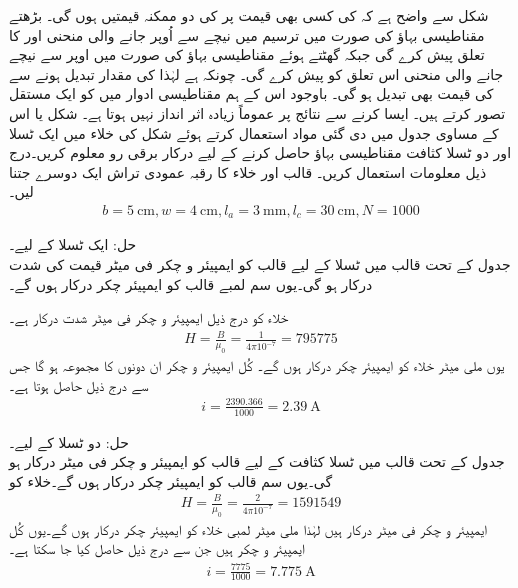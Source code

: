 شکل  سے واضح ہے کہ  کی کسی بھی قیمت پر  کی  دو ممکنہ قیمتیں ہوں گی۔ بڑھتے مقناطیسی بہاؤ کی صورت میں ترسیم میں نیچے سے اُوپر جانے والی منحنی  اور  کا تعلق پیش کرے گی جبکہ گھٹتے ہوئے مقناطیسی بہاؤ کی صورت میں  اوپر سے نیچے جانے والی منحنی اس تعلق کو پیش کرے  گی۔  چونکہ  ہے  لہٰذا  کی  مقدار تبدیل ہونے سے  کی قیمت  بھی تبدیل ہو گی۔ باوجود اس کے ہم مقناطیسی ادوار میں   کو ایک مستقل تصور کرتے ہیں۔ ایسا کرنے سے نتائج پر عموماً زیادہ اثر انداز نہیں ہوتا ہے۔
%
شکل   یا اس کے مساوی جدول  میں دی گئی مواد  استعمال کرتے ہوئے شکل   کی خلاء میں ایک ٹسلا اور دو ٹسلا کثافت  مقناطیسی بہاؤ حاصل کرنے کے لیے درکار برقی رو معلوم کریں۔درج ذیل معلومات استعمال کریں۔ قالب اور خلاء کا رقبہ عمودی تراش ایک دوسرے جتنا لیں۔
\begin{align*}
b=\SI{5}{\centi\meter},w=\SI{4}{\centi\meter},l_a=\SI{3}{\milli\meter},l_c=\SI{30}{\centi\meter},N=1000
\end{align*}


حل:\quad
 ایک ٹسلا کے لیے۔\\
 جدول  کے تحت قالب میں  ٹسلا  کے لیے  قالب کو   ایمپیئر و چکر فی  میٹر قیمت کی شدت   درکار ہو گی۔یوں  سم لمبے قالب کو   ایمپیئر چکر درکار ہوں گے۔

خلاء کو درج ذیل ایمپیئر و چکر فی میٹر شدت درکار ہے۔
\begin{align*}
H=\frac{B}{\mu_0}=\frac{1}{4\pi 10^{-7}}=\num{795775}
\end{align*}
یوں  ملی میٹر  خلاء کو  ایمپیئر چکر درکار ہوں گے۔ کُل ایمپیئر و چکر ان دونوں کا مجموعہ  ہو گا جس سے  درج ذیل حاصل ہوتا ہے۔
\begin{align*}
i=\frac{2390.366}{1000}=\SI{2.39}{\ampere}
\end{align*}	

حل: دو ٹسلا کے لیے۔\\
جدول  کے تحت قالب میں  ٹسلا  کثافت کے لیے  قالب کو  ایمپیئر و چکر فی میٹر  درکار ہو گی۔یوں  سم  قالب کو  ایمپیئر چکر درکار ہوں گے۔خلاء کو
\begin{align*}
H=\frac{B}{\mu_0}=\frac{2}{4\pi 10^{-7}}=\num{1591549}
\end{align*}
ایمپیئر و چکر فی میٹر درکار ہیں لہٰذا  ملی میٹر لمبی خلاء کو    ایمپیئر چکر درکار ہوں گے۔یوں کُل ایمپیئر و چکر  ہیں جن سے  درج ذیل حاصل کیا جا سکتا ہے۔
\begin{align*}
i=\frac{7775}{1000}=\SI{7.775}{\ampere}
\end{align*}

